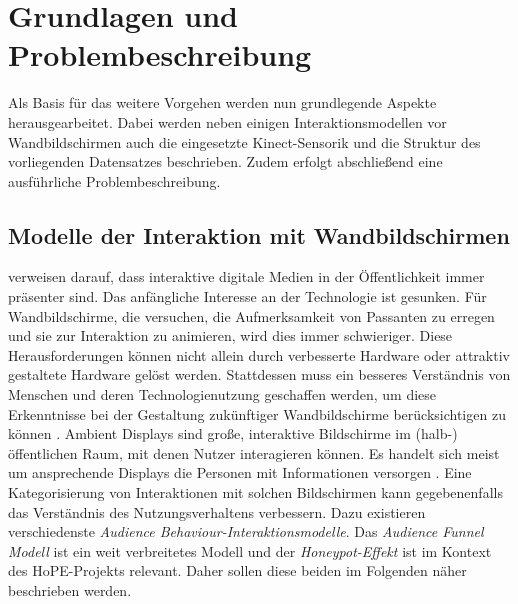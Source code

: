 \chapter{Grundlagen und Problembeschreibung}
\label{chapter2}
Als Basis für das weitere Vorgehen
werden nun grundlegende Aspekte herausgearbeitet.
Dabei werden neben einigen Interaktionsmodellen vor Wandbildschirmen
auch die eingesetzte Kinect-Sensorik und die Struktur des vorliegenden Datensatzes beschrieben.
Zudem erfolgt abschließend eine ausführliche Problembeschreibung.

\section{Modelle der Interaktion mit Wandbildschirmen}
\label{2-ModelleInteraktion-Wandbildschirme}
\citet{wouters_uncovering_2016} verweisen darauf, dass interaktive digitale Medien in der Öffentlichkeit immer präsenter sind.
Das anfängliche Interesse an der Technologie ist gesunken.
Für Wandbildschirme, die versuchen, die Aufmerksamkeit von Passanten zu erregen
und sie zur Interaktion zu animieren, wird dies immer schwieriger.
Diese Herausforderungen können nicht allein durch verbesserte Hardware
oder attraktiv gestaltete Hardware gelöst werden.
Stattdessen muss ein besseres Verständnis von Menschen und deren Technologienutzung geschaffen werden,
um diese Erkenntnisse bei der Gestaltung zukünftiger Wandbildschirme berücksichtigen zu können \citep{wouters_uncovering_2016}.
Ambient Displays sind große, interaktive Bildschirme im (halb-) öffentlichen Raum, mit denen Nutzer interagieren können.
Es handelt sich meist um ansprechende Displays die Personen mit Informationen versorgen \citep{mankoff_heuristic_2003}.
Eine Kategorisierung von Interaktionen mit solchen Bildschirmen kann gegebenenfalls das Verständnis des Nutzungsverhaltens verbessern.
Dazu existieren verschiedenste \emph{Audience Behaviour-Interaktionsmodelle}.
Das \emph{Audience Funnel Modell} ist ein weit verbreitetes Modell
und der \emph{Honeypot-Effekt} ist im Kontext des HoPE-Projekts relevant.
Daher sollen diese beiden im Folgenden näher beschrieben werden.

